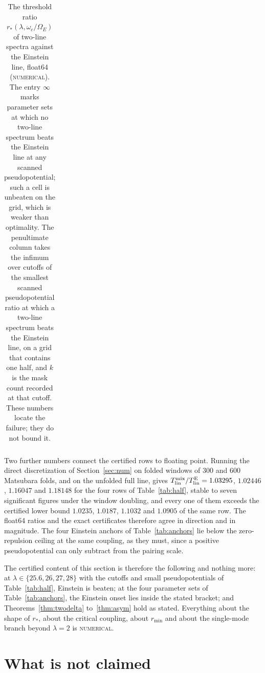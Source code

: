 \documentclass[11pt]{article}
\newcommand{\Tlin}{T_{\mathrm{lin}}}
\newcommand{\OmE}{\Omega_E}
\theoremstyle{definition}
\theoremstyle{remark}
\begin{document}
\begin{table}[t]
\begin{tabular}{@{}rrrrrrrrrrrr@{}}
\bottomrule
\end{tabular}
\caption{The threshold ratio $r_*(\lambda,\omega_c/\OmE)$ of two-line spectra against the
Einstein line, float64 (\textsc{numerical}). The entry $\infty$ marks parameter sets at
which no two-line spectrum beats the Einstein line at any scanned pseudopotential; such a
cell is unbeaten on the grid, which is weaker than optimality. The penultimate column takes
the infimum over cutoffs of the smallest scanned pseudopotential ratio at which a two-line
spectrum beats the Einstein line, on a grid that contains one half, and $k$ is the mask
count recorded at that cutoff. These numbers locate the failure; they do not bound it.}
\label{tab:phase}
\end{table}

Two further numbers connect the certified rows to floating point. Running the direct
discretization of Section~\ref{sec:num} on folded windows of $300$ and $600$ Matsubara
folds, and on the unfolded full line, gives $\Tlin^{\rm mix}/\Tlin^{\rm E}=1.03295$,
$1.02446$, $1.16047$ and $1.18148$ for the four rows of Table~\ref{tab:half}, stable to
seven significant figures under the window doubling, and every one of them exceeds the
certified lower bound $1.0235$, $1.0187$, $1.1032$ and $1.0905$ of the same row. The
float64 ratios and the exact certificates therefore agree in direction and in magnitude.
The four Einstein anchors of Table~\ref{tab:anchors} lie below the zero-repulsion ceiling
at the same coupling, as they must, since a positive pseudopotential can only subtract
from the pairing scale.

The certified content of this section is therefore the following and nothing more: at
$\lambda\in\{25.6,26,27,28\}$ with the cutoffs and small pseudopotentials of
Table~\ref{tab:half}, Einstein is beaten; at the four parameter sets of
Table~\ref{tab:anchors}, the Einstein onset lies inside the stated bracket; and
Theorems~\ref{thm:twodelta} to~\ref{thm:asym} hold as stated. Everything about the shape of
$r_*$, about the critical coupling, about $r_{\min}$ and about the single-mode branch
beyond $\lambda=2$ is \textsc{numerical}.

\section{What is not claimed}\label{sec:not}
\end{document}
